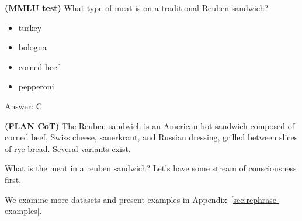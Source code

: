 \begin{example}\label{def:flan-example}
\textbf{(MMLU test)} \newline 
What type of meat is on a traditional Reuben sandwich?
    \begin{itemize}[noitemsep,topsep=0pt]
        \item[A.] turkey
        \item[B.] bologna
        \item[C.] corned beef
        \item[D.] pepperoni
    \end{itemize}

Answer: C


\textbf{(FLAN CoT)} \newline
The Reuben sandwich is an American hot sandwich composed of corned beef, Swiss cheese, sauerkraut, and Russian dressing, grilled between slices of rye bread. Several variants exist.

What is the meat in a reuben sandwich? Let's have some stream of consciousness first.
\end{example}

We examine more datasets and present examples in  Appendix~\ref{sec:rephrase-examples}.






